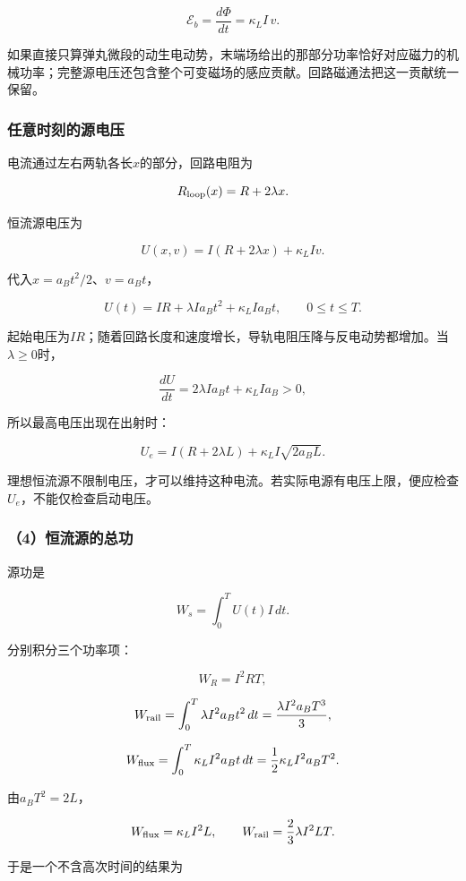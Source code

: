 \documentclass[12pt,a4paper,fontset=fandol]{ctexart}
\begin{document}
\[
\boxed{\mathcal E_b=\frac{d\Phi}{dt}
=\kappa_LI\,v}.
\]

如果直接只算弹丸微段的动生电动势，末端场给出的那部分功率恰好对应磁力的机械功率；完整源电压还包含整个可变磁场的感应贡献。回路磁通法把这一贡献统一保留。

\subsubsection{任意时刻的源电压}\label{ux4efbux610fux65f6ux523bux7684ux6e90ux7535ux538b}

电流通过左右两轨各长\(x\)的部分，回路电阻为

\[
R_{\rm loop}(x)=R+2\lambda x.
\]

恒流源电压为

\[
\boxed{U(x,v)=I(R+2\lambda x)+\kappa_LIv}.
\]

代入\(x=a_Bt^2/2\)、\(v=a_Bt\)，

\[
\boxed{U(t)=IR+\lambda Ia_Bt^2+\kappa_LIa_Bt},
\qquad 0\le t\le T.
\]

起始电压为\(IR\)；随着回路长度和速度增长，导轨电阻压降与反电动势都增加。当\(\lambda\ge0\)时，

\[
\frac{dU}{dt}=2\lambda Ia_Bt+\kappa_LIa_B>0,
\]

所以最高电压出现在出射时：

\[
\boxed{
U_e=I(R+2\lambda L)+\kappa_LI\sqrt{2a_BL}}.
\]

理想恒流源不限制电压，才可以维持这种电流。若实际电源有电压上限，便应检查\(U_e\)，不能仅检查启动电压。

\subsubsection{（4）恒流源的总功}\label{ux6052ux6d41ux6e90ux7684ux603bux529f}

源功是

\[
W_s=\int_0^T U(t)I\,dt.
\]

分别积分三个功率项：

\[
W_R=I^2RT,
\]

\[
W_{\rm rail}=
\int_0^T\lambda I^2a_Bt^2\,dt
=\frac{\lambda I^2a_BT^3}{3},
\]

\[
W_{\rm flux}=
\int_0^T\kappa_LI^2a_Bt\,dt
=\frac12\kappa_LI^2a_BT^2.
\]

由\(a_BT^2=2L\)，

\[
W_{\rm flux}=\kappa_LI^2L,
\qquad
W_{\rm rail}=\frac23\lambda I^2LT.
\]

于是一个不含高次时间的结果为
\end{document}
